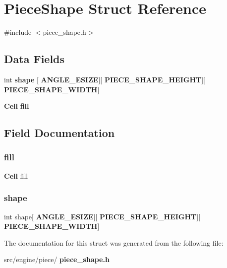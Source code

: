 \section{Piece\+Shape Struct Reference}
\label{structPieceShape}


{\ttfamily \#include $<$piece\+\_\+shape.\+h$>$}

\subsection*{Data Fields}
\begin{DoxyCompactItemize}
\item 
int \textbf{ shape} [\textbf{ A\+N\+G\+L\+E\+\_\+\+E\+S\+I\+ZE}][\textbf{ P\+I\+E\+C\+E\+\_\+\+S\+H\+A\+P\+E\+\_\+\+H\+E\+I\+G\+HT}][\textbf{ P\+I\+E\+C\+E\+\_\+\+S\+H\+A\+P\+E\+\_\+\+W\+I\+D\+TH}]
\item 
\textbf{ Cell} \textbf{ fill}
\end{DoxyCompactItemize}


\subsection{Field Documentation}
\mbox{\label{structPieceShape_a56827e5a472a2fa6b604a110d7398aaf}} 
\subsubsection{fill}
{\footnotesize\ttfamily \textbf{ Cell} fill}

\mbox{\label{structPieceShape_ad2366aa5b082ad2eab949ca0529bf186}} 
\subsubsection{shape}
{\footnotesize\ttfamily int shape[\textbf{ A\+N\+G\+L\+E\+\_\+\+E\+S\+I\+ZE}][\textbf{ P\+I\+E\+C\+E\+\_\+\+S\+H\+A\+P\+E\+\_\+\+H\+E\+I\+G\+HT}][\textbf{ P\+I\+E\+C\+E\+\_\+\+S\+H\+A\+P\+E\+\_\+\+W\+I\+D\+TH}]}



The documentation for this struct was generated from the following file\+:\begin{DoxyCompactItemize}
\item 
src/engine/piece/\textbf{ piece\+\_\+shape.\+h}\end{DoxyCompactItemize}
